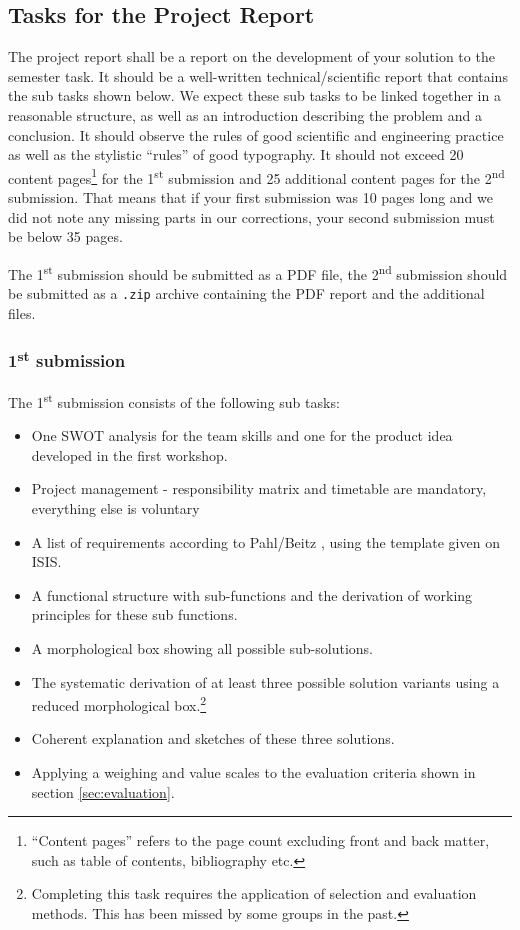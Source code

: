\documentclass[headinclude=true]{scrartcl}
\begin{document}
\subsection{Tasks for the Project Report}

The project report shall be a report on the development of your solution to the semester task. It should be a well-written technical/scientific report that contains the sub tasks shown below. We expect these sub tasks to be linked together in a reasonable structure, as well as an introduction describing the problem and a conclusion. It should observe the rules of good scientific and engineering practice as well as the stylistic ``rules'' of good typography. It should not exceed 20 content pages\footnote{``Content pages'' refers to the page count excluding front and back matter, such as table of contents, bibliography etc.} for the 1\textsuperscript{st} submission and 25 additional content pages for the 2\textsuperscript{nd} submission. That means that if your first submission was 10 pages long and we did not note any missing parts in our corrections, your second submission must be below 35 pages.

The 1\textsuperscript{st} submission should be submitted as a PDF file, the 2\textsuperscript{nd} submission should be submitted as a \texttt{.zip} archive containing the PDF report and the additional files.

\subsubsection{1\textsuperscript{st} submission}
The 1\textsuperscript{st} submission consists of the following sub tasks:
\begin{itemize}
 \item One SWOT analysis for the team skills and one for the product idea developed in the first workshop.
 \item Project management - responsibility matrix and timetable are mandatory, everything else is voluntary
 \item A list of requirements according to Pahl/Beitz \cite{Pahl2007}, using the template given on ISIS.
 \item A functional structure with sub-functions and the derivation of working principles for these sub functions.
 \item A morphological box showing all possible sub-solutions.
 \item The systematic derivation of at least three possible solution variants using a reduced morphological box.\footnote{Completing this task requires the application of selection and evaluation methods. This has been missed by some groups in the past.}
 \item Coherent explanation and sketches of these three solutions.
 \item Applying a weighing and value scales to the evaluation criteria shown in section \ref{sec:evaluation}.
\end{itemize}
\end{document}
